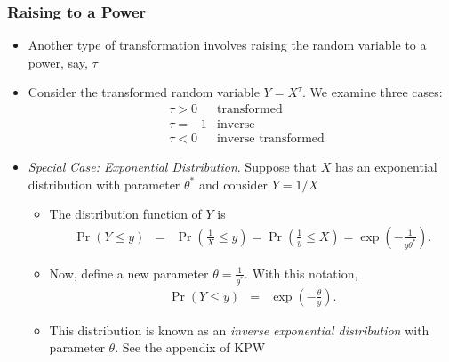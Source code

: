 \documentclass{beamer}
\begin{document}
\begin{frame}%
\frametitle{Raising to a Power}
\begin{itemize}
\item Another type of transformation involves raising the random variable to a power, say, $\tau$ %
\item Consider the transformed random variable $Y = X^{\tau}$. We examine three cases: %
\begin{eqnarray*}
&\tau>0&  \text{transformed}\\
&\tau=-1 &  \text{inverse}\\
&\tau<0 & \text{inverse transformed}
\end{eqnarray*} %
\item \textit{Special Case: Exponential Distribution}. Suppose that $X$ has an exponential distribution with parameter $\theta^{\ast}$ and consider $Y=1/X$ %
\begin{itemize}
\item The distribution function of $Y$ is
\begin{eqnarray*}
\Pr(Y \le y) &=& \Pr(\frac{1}{X} \le y) = \Pr(\frac{1}{y} \le X) = \exp\left(-\frac{1}{y \theta^\ast}\right) .
\end{eqnarray*}
\item Now, define a new parameter $\theta = \frac{1}{\theta^{\ast}}$. With this notation,
\begin{eqnarray*}
\Pr(Y \le y) &=& \exp\left(-\frac{\theta}{y}\right).
\end{eqnarray*}
\item This distribution is known as an \textit{inverse exponential distribution} with parameter $\theta$. See the appendix of KPW
\end{itemize}
\end{itemize}
\end{frame}
\end{document}
